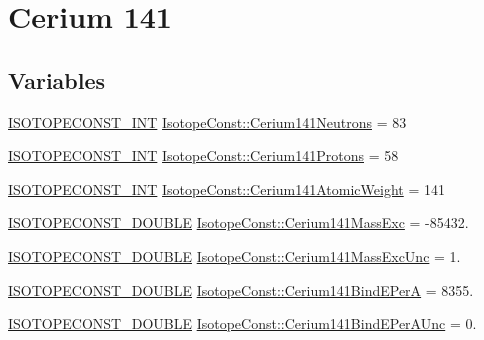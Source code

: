 \hypertarget{group___isotope_const-_cerium-_ce141}{}\section{Cerium 141}
\label{group___isotope_const-_cerium-_ce141}
\subsection*{Variables}
\begin{DoxyCompactItemize}
\item 
\mbox{\hyperlink{group___isotope_const-_macros_ga5f18360b3e99483a35c32d789e62621c}{I\+S\+O\+T\+O\+P\+E\+C\+O\+N\+S\+T\+\_\+\+I\+NT}} \mbox{\hyperlink{group___isotope_const-_cerium-_ce141_gabfcfbf62c54b6e573f84c75097aec819}{Isotope\+Const\+::\+Cerium141\+Neutrons}} = 83
\item 
\mbox{\hyperlink{group___isotope_const-_macros_ga5f18360b3e99483a35c32d789e62621c}{I\+S\+O\+T\+O\+P\+E\+C\+O\+N\+S\+T\+\_\+\+I\+NT}} \mbox{\hyperlink{group___isotope_const-_cerium-_ce141_ga03f8a151cf4e3c49910cdf00d6de5948}{Isotope\+Const\+::\+Cerium141\+Protons}} = 58
\item 
\mbox{\hyperlink{group___isotope_const-_macros_ga5f18360b3e99483a35c32d789e62621c}{I\+S\+O\+T\+O\+P\+E\+C\+O\+N\+S\+T\+\_\+\+I\+NT}} \mbox{\hyperlink{group___isotope_const-_cerium-_ce141_gad1c16c442fb2a6b2fefd0281a7d4e9cf}{Isotope\+Const\+::\+Cerium141\+Atomic\+Weight}} = 141
\item 
\mbox{\hyperlink{group___isotope_const-_macros_ga8f45a7272ce02c0b4c65c44636ed719a}{I\+S\+O\+T\+O\+P\+E\+C\+O\+N\+S\+T\+\_\+\+D\+O\+U\+B\+LE}} \mbox{\hyperlink{group___isotope_const-_cerium-_ce141_ga40f992041cf28c95ac693969a03a83f4}{Isotope\+Const\+::\+Cerium141\+Mass\+Exc}} = -\/85432.
\item 
\mbox{\hyperlink{group___isotope_const-_macros_ga8f45a7272ce02c0b4c65c44636ed719a}{I\+S\+O\+T\+O\+P\+E\+C\+O\+N\+S\+T\+\_\+\+D\+O\+U\+B\+LE}} \mbox{\hyperlink{group___isotope_const-_cerium-_ce141_gaaf950c359c8717324ecac64b33ba2927}{Isotope\+Const\+::\+Cerium141\+Mass\+Exc\+Unc}} = 1.
\item 
\mbox{\hyperlink{group___isotope_const-_macros_ga8f45a7272ce02c0b4c65c44636ed719a}{I\+S\+O\+T\+O\+P\+E\+C\+O\+N\+S\+T\+\_\+\+D\+O\+U\+B\+LE}} \mbox{\hyperlink{group___isotope_const-_cerium-_ce141_ga849b10db58c9c66620d75c09770ba995}{Isotope\+Const\+::\+Cerium141\+Bind\+E\+PerA}} = 8355.
\item 
\mbox{\hyperlink{group___isotope_const-_macros_ga8f45a7272ce02c0b4c65c44636ed719a}{I\+S\+O\+T\+O\+P\+E\+C\+O\+N\+S\+T\+\_\+\+D\+O\+U\+B\+LE}} \mbox{\hyperlink{group___isotope_const-_cerium-_ce141_gadf61496a596247f86eadf505070939f2}{Isotope\+Const\+::\+Cerium141\+Bind\+E\+Per\+A\+Unc}} = 0.

\end{DoxyCompactItemize}
